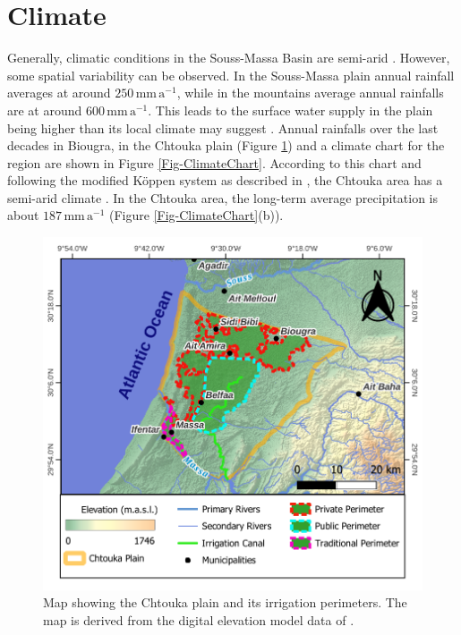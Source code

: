\section{Climate}
\label{Sec-SouMaClimate}

Generally, climatic conditions in the Souss-Massa Basin are semi-arid \parencite{Choukr.2017}. 
However, some spatial variability can be observed. 
In the Souss-Massa plain annual rainfall averages at around $250 \, \textrm{mm} \, \textrm{a}^{-1}$, while in the mountains average annual rainfalls are at around $600 \, \textrm{mm} \, \textrm{a}^{-1}$. 
This leads to the surface water supply in the plain being higher than its local climate may suggest \parencite{Hssaisoune.2017}. 
Annual rainfalls over the last decades in Biougra, in the Chtouka plain (Figure \ref{Map-ChtoukaOverview}) and a climate chart for the region are shown in Figure \ref{Fig-ClimateChart}. 
According to this chart and following the modified Köppen system as described in \textcite{Critchfield.1983}, the Chtouka area has a semi-arid climate \parencite{Choukr.2017}. 
In the Chtouka area, the long-term average precipitation is about $ 187 \, \textrm{mm} \, \textrm{a}^{-1}$ (Figure \ref{Fig-ClimateChart}(b)).

\begin{figure}[p]
    \centering
    \includegraphics[width=1\textwidth]{./img/Map_ChtoukaOverview.pdf}
    \caption{Map showing the Chtouka plain and its irrigation perimeters. The map is derived from the digital elevation model data of \cite{NASA.SRTM1Arc}.}
    \label{Map-ChtoukaOverview}
\end{figure}

